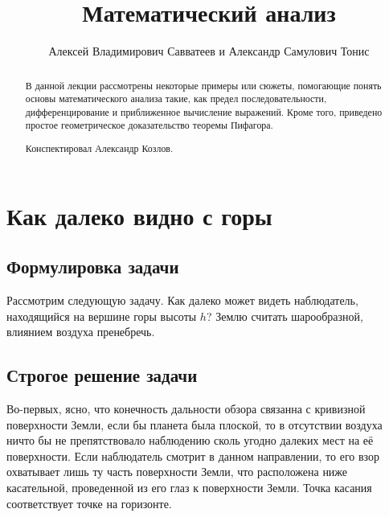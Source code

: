 \documentclass[a4paper,9pt,russian]{article}
\title{Математический анализ}
\author{Алексей Владимирович Савватеев и Александр Самулович Тонис}
\begin{document}
\maketitle
\begin{abstract}
	В данной лекции рассмотрены некоторые примеры или сюжеты, помогающие понять основы математического анализа такие, как предел последовательности, дифференцирование и приближенное вычисление выражений. Кроме того, приведено простое геометрическое доказательство теоремы Пифагора.
	\par
	Конспектировал Александр Козлов. 
\end{abstract}	
\tableofcontents
\newpage
\section{Как далеко видно с горы}

\subsection{Формулировка задачи}
Рассмотрим следующую задачу. Как далеко может видеть наблюдатель, находящийся на вершине горы высоты $h$? Землю считать шарообразной, влиянием воздуха пренебречь. 

\subsection{Строгое решение задачи}
Во\--первых, ясно, что конечность дальности обзора связанна с кривизной поверхности Земли, если бы планета была плоской, то в отсутствии воздуха ничто бы не препятствовало наблюдению сколь угодно далеких мест на её поверхности. Если наблюдатель смотрит в данном направлении, то его взор охватывает лишь ту часть поверхности Земли, что расположена ниже касательной, проведенной из его глаз к поверхности Земли. Точка касания соответствует точке на горизонте. 
\end{document}
